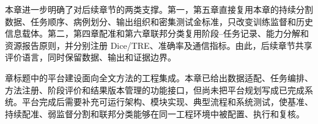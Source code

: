 本章进一步明确了对后续章节的两类支撑。第一，第五章直接复用本章的持续分割数据、任务顺序、病例划分、输出组织和密集测试金标准，只改变训练监督和历史信息载体。第二，第四章配准和第六章联邦分类复用阶段--任务记录、能力分解和资源报告原则，并分别注册 Dice/TRE、准确率及通信指标。由此，后续章节共享评价语言，同时保留数据、输出和证据边界。

章标题中的平台建设面向全文方法的工程集成。本章已给出数据适配、任务编排、方法注册、阶段评价和结果版本管理的功能接口，但尚未把平台规划写成已完成系统。平台完成后需要补充可运行架构、模块实现、典型流程和系统测试，使基准、持续配准、弱监督分割和联邦分类能够在同一工程环境中被配置、执行和复核。
